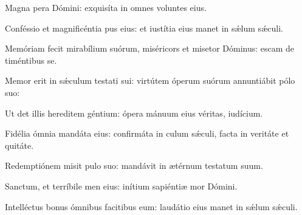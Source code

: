 \item {}

\item Magna pera Dómini:\psstar{} exquisíta in omnes voluntes eius.

\item Conféssio et magnificéntia pus eius:\psstar{} et iustítia eius manet in sǽlum sǽculi.

\item Memóriam fecit mirabílium suórum,\pscross{} miséricors et misetor Dóminus:\psstar{} escam de timéntibus se.

\item Memor erit in sǽculum testati sui:\psstar{} virtútem óperum suórum annuntiábit pólo suo:

\item Ut det illis hereditem géntium:\psstar{} ópera mánuum eius véritas,  iudícium.

\item Fidélia ómnia mandáta eius:\pscross{} confirmáta in culum sǽculi,\psstar{} facta in veritáte et quitáte.

\item Redemptiónem misit pulo suo:\psstar{} mandávit in ætérnum testatum suum.

\item Sanctum, et terríbile men eius:\psstar{} inítium sapiéntiæ mor Dómini.

\item Intelléctus bonus ómnibus facitibus eum:\psstar{} laudátio eius manet in sǽlum sǽculi.